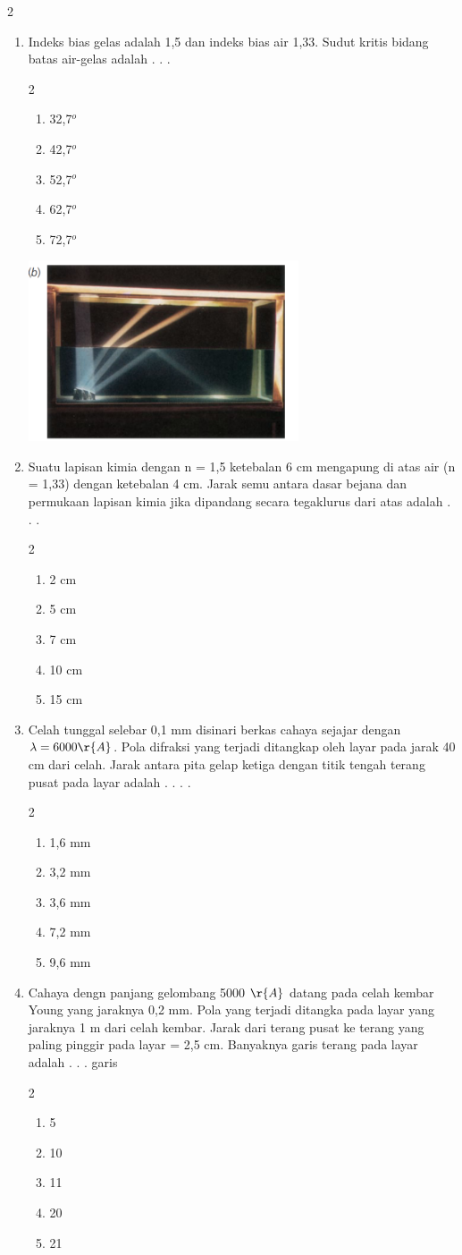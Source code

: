 \documentclass[11pt,a4paper]{extarticle}
\newcommand{\pilgani}[1]{                            \vspace{-0.3cm}\begin{multicols}{2}
 \begin{enumerate}[label=\Alph*., itemsep=0pt,topsep=0pt,leftmargin=*,align=Center]#1                     \end{enumerate}
 \phantom{ini cuma sapi, wedus, dan ayam}
 \end{multicols}}
\begin{document}
\begin{multicols*}{2}
\begin{enumerate}
\vspace{3cm}
\item Indeks bias gelas adalah 1,5 dan indeks bias air 1,33. Sudut kritis bidang batas air-gelas adalah . . .
\pilgani{
        \item 32,7$^o$
        \item 42,7$^o$
        \item 52,7$^o$
        \item 62,7$^o$
        \item 72,7$^o$
        }
\includegraphics[width=8cm]{pic/kritis}
\vspace{3cm}
\item Suatu lapisan kimia dengan n = 1,5 ketebalan 6 cm mengapung di atas air (n = 1,33) dengan ketebalan 4 cm. Jarak semu antara dasar bejana dan permukaan lapisan kimia jika dipandang secara tegaklurus dari atas adalah  . . . 
\pilgani{
        \item 2 cm
        \item 5 cm
        \item 7 cm
        \item 10 cm
        \item 15 cm
        }
\vspace{3cm}
\item Celah tunggal selebar 0,1 mm disinari berkas cahaya sejajar dengan $\lambda = 6000 \r{A}$. Pola difraksi yang terjadi ditangkap oleh layar pada jarak 40 cm dari celah. Jarak antara pita gelap ketiga dengan titik tengah terang pusat pada layar adalah . . . .
\pilgani{
        \item 1,6 mm
        \item 3,2 mm
        \item 3,6 mm
        \item 7,2 mm
        \item 9,6 mm
        }

\vspace{3cm}
\item Cahaya dengn panjang gelombang 5000 $\r{A}$ datang pada celah kembar Young yang jaraknya 0,2 mm. Pola yang terjadi ditangka pada layar yang jaraknya 1 m dari celah kembar. Jarak dari terang pusat ke terang yang paling pinggir pada layar = 2,5 cm. Banyaknya garis terang pada layar adalah . . . garis
\pilgani{
        \item 5
        \item 10
        \item 11
        \item 20
        \item 21
        }


\end{enumerate}
\end{multicols*}
\end{document}
